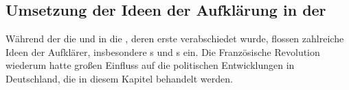 
\subsection{Umsetzung der Ideen der Aufklärung in der
}

Während der die  und in die , deren erste
 verabschiedet wurde, flossen zahlreiche Ideen der
Aufklärer, insbesondere s und s ein. Die
Französische Revolution wiederum hatte großen Einfluss auf die
politischen Entwicklungen in Deutschland, die in diesem Kapitel
behandelt werden.

\endinput
